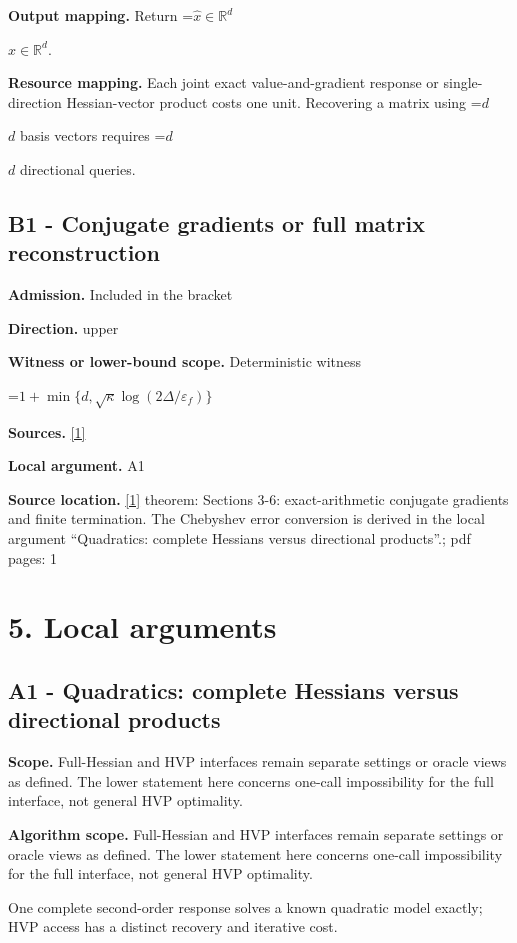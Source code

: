 \documentclass[10pt,a4paper]{article}
\newcommand{\AtlasMath}[1]{\par\begingroup\centering\setbox0=\hbox{$\displaystyle #1$}\ifdim\wd0>1.4\linewidth\typeout{ATLAS WIDE FORMULA: \the\wd0}\fi\ifdim\wd0>\linewidth\resizebox{\linewidth}{!}{\box0}\else\box0\fi\par\endgroup}
\newcommand{\AtlasInlineMath}[1]{\begingroup\setbox0=\hbox{$#1$}\ifdim\wd0>.4\linewidth\endgroup\AtlasMath{#1}\else\endgroup$#1$\fi}
\begin{document}
\textbf{Output mapping.} Return \AtlasInlineMath{\widehat{x}\in \mathbb{R}^d}.

\textbf{Resource mapping.} Each joint exact value-and-gradient response or single-direction Hessian-vector product costs one unit. Recovering a matrix using \AtlasInlineMath{d} basis vectors requires \AtlasInlineMath{d} directional queries.

\subsection{B1 - Conjugate gradients or full matrix reconstruction}
\textbf{Admission.} Included in the bracket

\textbf{Direction.} upper

\textbf{Witness or lower-bound scope.} Deterministic witness

\AtlasMath{1+\min\{d,\sqrt\kappa\log(2\Delta/\varepsilon_f)\}}
\textbf{Sources.} \href{https://nvlpubs.nist.gov/nistpubs/jres/049/jresv49n6p409_a1b.pdf}{[1]}

\textbf{Local argument.} A1

\textbf{Source location.} \href{https://nvlpubs.nist.gov/nistpubs/jres/049/jresv49n6p409_a1b.pdf}{[1]} theorem: Sections 3-6: exact-arithmetic conjugate gradients and finite termination. The Chebyshev error conversion is derived in the local argument “Quadratics: complete Hessians versus directional products”.; pdf pages: 1

\section{5. Local arguments}
\subsection{A1 - Quadratics: complete Hessians versus directional products}
\textbf{Scope.} Full-Hessian and HVP interfaces remain separate settings or oracle views as defined. The lower statement here concerns one-call impossibility for the full interface, not general HVP optimality.

\textbf{Algorithm scope.} Full-Hessian and HVP interfaces remain separate settings or oracle views as defined. The lower statement here concerns one-call impossibility for the full interface, not general HVP optimality.

One complete second-order response solves a known quadratic model exactly; HVP access has a distinct recovery and iterative cost.
\end{document}
